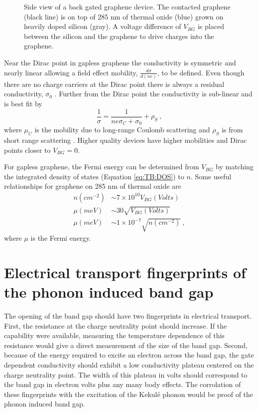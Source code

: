 \begin{figure}
	\begin{center}
	
	\end{center}
	\caption[Side view of a back gated graphene device.]{\label{fig:kek:FET} 
	Side view of a back gated graphene device.
	The contacted graphene (black line) is on top of 285 nm of thermal oxide (blue) grown on heavily doped silicon (gray).
	A voltage difference of $V_{BG}$ is placed between the silicon and the graphene to drive charges into the graphene.
	}	
\end{figure}

Near the Dirac point in gapless graphene the conductivity is symmetric and nearly linear allowing a field effect mobility, $\frac{d \sigma}{d (n e)}$, to be defined.
Even though there are no charge carriers at the Dirac point there is always a residual conductivity, $\sigma_0$ \cite{DasSarma2011}.
Further from the Dirac point the conductivity is sub-linear and is best fit by
\begin{equation*}
	\frac{1}{\sigma}=\frac{1}{n e \sigma_C + \sigma_0} + \rho_S \ ,
\end{equation*}
where $\mu_C$ is the mobility due to long-range Coulomb scattering and $\rho_S$ is from short range scattering \cite{Dean2010,DasSarma2011,Remi2013T}.
Higher quality devices have higher mobilities and Dirac points closer to $V_{BG}=0$.

For gapless graphene, the Fermi energy can be determined from $V_{BG}$ by matching the integrated density of states (Equation \ref{eq:TB:DOS}) to $n$.
Some useful relationships for graphene on 285 nm of thermal oxide are
\begin{align*}
	n(cm^{-2})&\sim 7 \times 10^{10} V_{BG} (Volts) \\
	\mu(meV) &\sim 30 \sqrt{V_{BG} (Volts)} \\
	\mu(meV) &\sim 1 \times 10^{-7} \sqrt{n(cm^{-2})} \ ,
\end{align*}
where $\mu$ is the Fermi energy.

\section{Electrical transport fingerprints of the phonon induced band gap}
The opening of the band gap should have two fingerprints in electrical transport.
First, the resistance at the charge neutrality point should increase.
If the capability were available, measuring the temperature dependence of this resistance would give a direct measurement of the size of the band gap.
Second, because of the energy required to excite an electron across the band gap, the gate dependent conductivity should exhibit a low conductivity plateau centered on the charge neutrality point.
The width of this plateau in volts should correspond to the band gap in electron volts plus any many body effects.
The corrolation of these fingerprints with the excitation of the Kekul\'e phonon would be proof of the phonon induced band gap.

